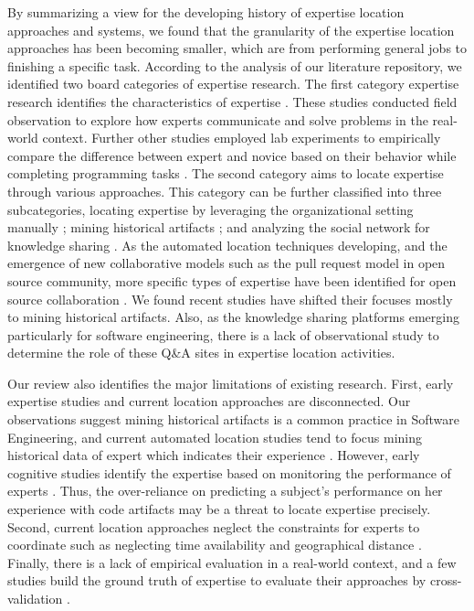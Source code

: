 By summarizing a view for the developing history of expertise location approaches and systems, we found that the granularity of the expertise location approaches has been becoming smaller, which are from performing general jobs to finishing a specific task. According to the analysis of our literature repository, we identified two board categories of expertise research. The first category expertise research identifies the characteristics of expertise \cite{ericsson2006cambridge, MCKEITHEN1981307, soloway1984empirical}. These studies conducted field observation \cite{mcdonald1998just} to explore how experts communicate and solve problems in the real-world context. Further other studies employed lab experiments to empirically compare the difference between expert and novice based on their behavior while completing programming tasks \cite{MCKEITHEN1981307}. The second category aims to locate expertise through various approaches. This category can be further classified into three subcategories, locating expertise by leveraging the organizational setting manually \cite{yarosh2013need}; mining historical artifacts \cite{Anvik2006who, mockus2002expertise, schuler2008mining, servant2012whosefault, fritz2010degree}; and analyzing the social network for knowledge sharing \cite{nardi2002integrating, lin2009smallblue}. As the automated location techniques developing, and the emergence of new collaborative models such as the pull request model in open source community, more specific types of expertise have been identified for open source collaboration \cite{costa2016tipmerge, yu2016reviewer, chan2016improving}. We found recent studies have shifted their focuses mostly to mining historical artifacts. Also, as the knowledge sharing platforms emerging particularly for software engineering, there is a lack of observational study to determine the role of these Q\&A sites in expertise location activities.


Our review also identifies the major limitations of existing research. First, early expertise studies and current location approaches are disconnected. Our observations suggest mining historical artifacts is a common practice in Software Engineering, and current automated location studies tend to focus mining historical data of expert which indicates their experience \cite{servant2012whosefault,costa2016tipmerge, yu2016reviewer}. However, early cognitive studies identify the expertise based on monitoring the performance of experts \cite{MCKEITHEN1981307, soloway1984empirical, pinto1988providing}. Thus, the over-reliance on predicting a subject's performance on her experience with code artifacts may be a threat to locate expertise precisely. Second, current location approaches neglect the constraints for experts to coordinate such as neglecting time availability and geographical distance \cite{olson2000distance}. Finally, there is a lack of empirical evaluation in a real-world context, and a few studies build the ground truth of expertise to evaluate their approaches by cross-validation \cite{Anvik2006who, xu2016predicting}.

